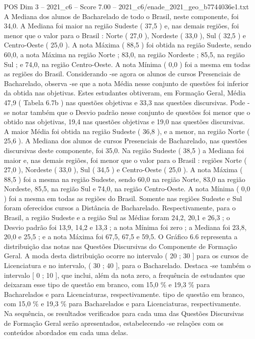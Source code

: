 \begin{textsample}{POS Dim 3 – 2021\_c6 – Score 7.00 – 2021\_c6/enade\_2021\_geo\_b7744036e1.txt}
A Mediana dos alunos de Bacharelado de todo o Brasil, neste componente, foi 34,0.
A Mediana foi maior na região Sudeste ( 37,5 ) e, nas demais regiões, foi menor que o valor para o Brasil : Norte ( 27,0 ), Nordeste ( 33,0 ), Sul ( 32,5 ) e Centro-Oeste ( 25,0 ).
A nota Máxima ( 88,5 ) foi obtida na região Sudeste, sendo 60,0, a nota Máxima na região Norte ; 83,0, na região Nordeste ; 85,5, na região Sul ; e 74,0, na região Centro-Oeste.
A nota Mínima ( 0,0 ) foi a mesma em todas as regiões do Brasil.
Considerando -se agora os alunos de cursos Presenciais de Bacharelado, observa -se que a nota Média nesse conjunto de questões foi inferior da obtida nas objetivas.
Estes estudantes obtiveram, em Formação Geral, Média 47,9 ( Tabela 6.7b ) nas questões objetivas e 33,3 nas questões discursivas.
Pode -se notar também que o Desvio padrão nesse conjunto de questões foi menor que o obtido nas objetivas, 19,4 nas questões objetivas e 19,0 nas questões discursivas.
A maior Média foi obtida na região Sudeste ( 36,8 ), e a menor, na região Norte ( 25,6 ).
A Mediana dos alunos de cursos Presenciais de Bacharelado, nas questões discursivas deste componente, foi 35,0.
Na região Sudeste ( 38,5 ) a Mediana foi maior e, nas demais regiões, foi menor que o valor para o Brasil : regiões Norte ( 27,0 ), Nordeste ( 33,0 ), Sul ( 34,5 ) e Centro-Oeste ( 25,0 ).
A nota Máxima ( 88,5 ) foi a mesma na região Sudeste, sendo 60,0 na região Norte, 83,0 na região Nordeste, 85,5, na região Sul e 74,0, na região Centro-Oeste.
A nota Mínima ( 0,0 ) foi a mesma em todas as regiões do Brasil.
Somente nas regiões Sudeste e Sul foram oferecidos cursos a Distância de Bacharelado.
Respectivamente, para o Brasil, a região Sudeste e a região Sul as Médias foram 24,2, 20,1 e 26,3 ; o Desvio padrão foi 13,9, 14,2 e 13,3 ; a nota Mínima foi zero ; a Mediana foi 23,8, 20,0 e 25,5 ; e a nota Máxima foi 67,5, 67,5 e 59,5.
O Gráfico 6.6 representa a distribuição das notas nas Questões Discursivas do Componente de Formação Geral.
A moda desta distribuição ocorre no intervalo ( 20 ; 30 ] para os cursos de Licenciatura e no intervalo, ( 30 ; 40 ], para o Bacharelado.
Destaca -se também o intervalo [ 0 ; 10 ], que inclui, além da nota zero, a frequência de estudantes que deixaram esse tipo de questão em branco, com 15,0 \% e 19,3 \% para Bacharelados e para Licenciaturas, respectivamente. tipo de questão em branco, com 15,0 \% e 19,3 \% para Bacharelados e para Licenciaturas, respectivamente.
Na sequência, os resultados verificados para cada uma das Questões Discursivas de Formação Geral serão apresentados, estabelecendo -se relações com os conteúdos abordados em cada uma delas.

\end{textsample}
